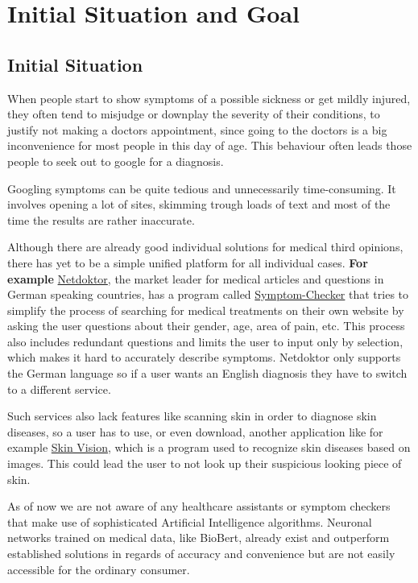 \documentclass[12pt]{article}
\theoremstyle{definition}
\begin{document}
\tableofcontents
\pagebreak

\section{Initial Situation and Goal}

\subsection{Initial Situation}

When people start to show symptoms of a possible sickness or get mildly injured, they often tend to misjudge or downplay the severity of their conditions, to justify not making a doctors appointment, since going to the doctors is a big inconvenience for most people in this day of age. This behaviour often leads those people to seek out to google for a diagnosis.

Googling symptoms can be quite tedious and unnecessarily time-consuming. It involves opening a lot of sites, skimming trough loads of text and most of the time the results are rather inaccurate. 

Although there are already good individual solutions for medical third opinions, there has yet to be a simple unified platform for all individual cases.
{\bf For example} \href{https://www.netdoktor.de/}{Netdoktor}, the market leader for medical articles and questions in German speaking countries, has a program called \href{https://www.netdoktor.de/symptom-checker/}{Symptom-Checker} that tries to simplify the process of searching for medical treatments on their own website by asking the user questions about their gender, age, area of pain, etc. This process also includes redundant questions and limits the user to input only by selection, which makes it hard to accurately describe symptoms. Netdoktor only supports the German language so if a user wants an English diagnosis they have to switch to a different service.

Such services also lack features like scanning skin in order to diagnose skin diseases, so a user has to use, or even download, another application like for example \href{http://www.skinvision.com}{Skin Vision}, which is a program used to recognize skin diseases based on images. This could lead the user to not look up their suspicious looking piece of skin. 

As of now we are not aware of any healthcare assistants or symptom checkers that make use of sophisticated Artificial Intelligence algorithms. Neuronal networks trained on medical data, like BioBert, already exist and outperform established solutions in regards of accuracy and convenience but are not easily accessible for the ordinary consumer.
\end{document}

